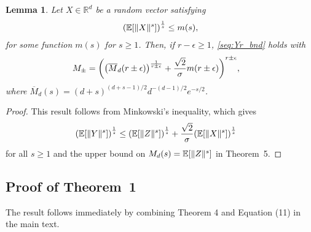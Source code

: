 \documentclass{article}
\newtheorem{lemma}[theorem]{Lemma}
\theoremstyle{definition}
\newcommand{\reals}{\mathbb{R}}
\newcommand{\ex}[1]{\ensuremath{\mathbb{E}\left[ #1\right]}}
\newcommand{\eps}{\epsilon}
\let\originalleft\left
\let\originalright\right
\renewcommand{\left}{\mathopen{}\mathclose\bgroup\originalleft}
\renewcommand{\right}{\aftergroup\egroup\originalright}
\begin{document}
\begin{lemma}\label{lem:Mpm_bnd}
Let $X \in \reals^d$ be a random vector satisfying
\begin{align}
   \left( \ex{ \|X\|^{s}} \right)^\frac{1}{s}  \le m(s),
\end{align}
for some function $m(s)$ for $s \ge 1$.  Then, if $r -\eps \ge 1$,  \eqref{seq:Yr_bnd} holds with
\begin{align}
    M_{\pm} & = \left( \left(\overline{M}_{d}(r \pm \eps)\right)^{\frac{1}{r \pm \eps}}  + \frac{ \sqrt{2}}{\sigma}  m(r \pm \eps)  \right)^{r \pm \eps},%
\end{align}
where $\overline{M}_d(s) = (d+s)^{(d+s -1)/2}d^{-(d-1)/2} e^{-s/2}$. 
\end{lemma}
\begin{proof}
This result follows from Minkowski's inequality, which gives
\begin{align*}
    \left( \ex{ \|Y\|^s} \right)^\frac{1}{s}  & \le  \left( \ex{ \|Z\|^{s} }\right)^\frac{1}{s}   + \frac{ \sqrt{2}}{\sigma} \left( \ex{ \|X\|^{s} }\right)^\frac{1}{s}
\end{align*}
for all $s \ge 1$ and the upper bound on $M_{d}(s) = \ex{ \|Z\|^s}$ in Theorem~5. 
\end{proof}

\subsection{Proof of Theorem~1} 
The result follows immediately by combining Theorem 4 and Equation (11) in the main text. 
\end{document}
